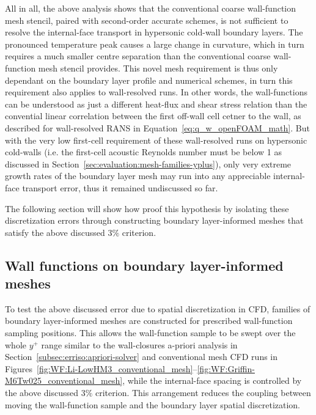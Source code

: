 All in all, the above analysis shows that the conventional coarse wall-function mesh stencil, paired with second-order accurate schemes, is not sufficient to resolve the internal-face transport in hypersonic cold-wall boundary layers. The pronounced temperature peak causes a large change in curvature, which in turn requires a much smaller centre separation than the conventional coarse wall-function mesh stencil provides. This novel mesh requirement is thus only dependant on the boundary layer profile and numerical schemes, in turn this requirement also applies to wall-resolved runs. In other words, the wall-functions can be understood as just a different heat-flux and shear stress relation than the convential linear correlation between the first off-wall cell cetner to the wall, as described for wall-resolved RANS in Equation~\eqref{eq:q_w_openFOAM_math}. But with the very low first-cell requirement of these wall-resolved runs on hypersonic cold-walls (i.e. the first-cell acoustic Reynolds number must be below 1 as discussed in Section~\ref{sec:evaluation:mesh-families-yplus}), only very extreme growth rates of the boundary layer mesh may run into any appreciable internal-face transport error, thus it remained undiscussed so far.
\par\medskip

The following section will show how proof this hypothesis by isolating these discretization errors through constructing boundary layer-informed meshes that satisfy the above discussed $3\%$ criterion.

\subsection{Wall functions on boundary layer-informed meshes}
\label{subsec:comparative:zpg:informed-mesh}

To test the above discussed error due to spatial discretization in CFD, families of boundary layer-informed meshes are constructed for prescribed wall-function sampling positions. This allows the wall-function sample to be swept over the whole $y^+$ range similar to the wall-closures a-priori analysis in Section~\ref{subsec:erriso:apriori-solver} and conventional mesh CFD runs in Figures~\ref{fig:WF:Li-LowHM3_conventional_mesh}--\ref{fig:WF:Griffin-M6Tw025_conventional_mesh}, while the internal-face spacing is controlled by the above discussed $3\%$ criterion. This arrangement reduces the coupling between moving the wall-function sample and the boundary layer spatial discretization.
\par\medskip

